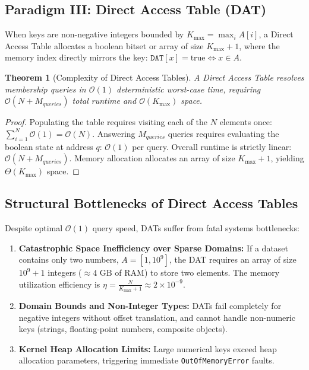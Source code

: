 \documentclass[10pt,twocolumn,letterpaper]{article}
\newtheorem{theorem}{Theorem}
\begin{document}
\subsection{Paradigm III: Direct Access Table (DAT)}
When keys are non-negative integers bounded by $K_{\max} = \max_{i} A[i]$, a Direct Access Table allocates a boolean bitset or array of size $K_{\max} + 1$, where the memory index directly mirrors the key: $\texttt{DAT}[x] = \text{true} \iff x \in A$.

\begin{theorem}[Complexity of Direct Access Tables]
A Direct Access Table resolves membership queries in $\mathcal{O}(1)$ deterministic worst-case time, requiring $\mathcal{O}(N + M_{queries})$ total runtime and $\mathcal{O}(K_{\max})$ space.
\end{theorem}

\begin{proof}
Populating the table requires visiting each of the $N$ elements once: $\sum_{i=1}^N \mathcal{O}(1) = \mathcal{O}(N)$. Answering $M_{queries}$ queries requires evaluating the boolean state at address $q$: $\mathcal{O}(1)$ per query. Overall runtime is strictly linear: $\mathcal{O}(N + M_{queries})$. Memory allocation allocates an array of size $K_{\max} + 1$, yielding $\Theta(K_{\max})$ space.
\end{proof}

\subsection{Structural Bottlenecks of Direct Access Tables}
Despite optimal $\mathcal{O}(1)$ query speed, DATs suffer from fatal systems bottlenecks:
\begin{enumerate}
    \item \textbf{Catastrophic Space Inefficiency over Sparse Domains:} If a dataset contains only two numbers, $A = [1, 10^9]$, the DAT requires an array of size $10^9 + 1$ integers ($\approx 4\text{ GB}$ of RAM) to store two elements. The memory utilization efficiency is $\eta = \frac{N}{K_{\max}+1} \approx 2 \times 10^{-9}$.
    \item \textbf{Domain Bounds and Non-Integer Types:} DATs fail completely for negative integers without offset translation, and cannot handle non-numeric keys (strings, floating-point numbers, composite objects).
    \item \textbf{Kernel Heap Allocation Limits:} Large numerical keys exceed heap allocation parameters, triggering immediate \texttt{OutOfMemoryError} faults.
\end{enumerate}
\end{document}
